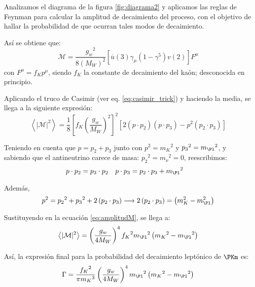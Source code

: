 Analizamos el diagrama de la figura \ref{fig:diagrama2} y aplicamos las reglas de Feynman para calcular la amplitud de decaimiento del proceso, con el objetivo de hallar la probabilidad de que ocurran tales modos de decaimiento. 

Así se obtiene que:
\begin{equation}
\mathcal{M} =\dfrac{{g_{w}}^2}{8\left( M_W\right)^{2}}\left[ \overline{u}\left(3\right) \gamma_{\mu}\left( 1-\gamma^{5} \right) v\left( 2\right) \right] F^{\mu}\label{eq:Msimple}
\end{equation}
con $F^{\mu}=f_K p^{\mu}$, siendo $f_K$ la constante de decaimiento del kaón; desconocida en principio.

Aplicando el truco de Casimir (ver eq. \ref{eq:casimir_trick}) y haciendo la media, se llega a la siguiente expresión:
\begin{equation}
\left\langle |\mathcal{M}|^{2}\right\rangle=\dfrac{1}{8}\left[ f_{K}\left( \dfrac{g_w}{M_W}\right) ^{2}\right] ^{2}\left[2\left( p\cdot p_{2}\right) \left( p\cdot p_{3}\right) -p^{2}\left( p_{2}\cdot p_{3}\right)\right]\label{eq:amplitudM}
\end{equation}

Teniendo en cuenta que $p=p_{2}+p_{3}$ junto con $p^2={m_K}^2$ y ${p_3}^2={m_{\Pl}}^2$, y sabiendo que el antineutrino carece de masa: ${p_2}^2={m_{\nu}}^2=0$, reescribimos:
\begin{align}
p\cdot p_{2} &= p_{3} \cdot p_{2} & p \cdot p_{3} &= p_{2} \cdot p_{3}+{m_{\Pl}}^2
\end{align}

Además,
\begin{equation}
p^{2}={p_{2}}^{2}+{p_3}^{2}+2\left( p_{2} \cdot p_{3}\right) \longrightarrow 2\left( p_{2} \cdot p_{3}\right)=\left( m_{K}^{2}-m_{\Pl}^{2}\right)
\end{equation}

Sustituyendo en la ecuación \ref{eq:amplitudM}, se llega a:
\begin{equation}
\left\langle |\mathcal{M}|^{2}\right\rangle=\left( \dfrac{g_w}{4M_W}\right)^{4} {f_K}^2 {m_{\Pl}}^{2}\left( {m_{K}}^{2}-{m_{\Pl}}^{2}\right)\label{eq:amplitudmedia}
\end{equation}

Así, la expresión final para la probabilidad del decaimiento leptónico de $\PKm$ es:
\begin{equation}
\Gamma =\dfrac{{f_{K}}^{2}}{\pi {m_{K}}^{3}}\left( \dfrac{g_w}{4M_W}\right)^{4}{m_{\Pl}}^{2}\left({m_{K}}^{2}-{m_{\Pl}}^{2}\right)\label{eq:decayrate}
\end{equation}

